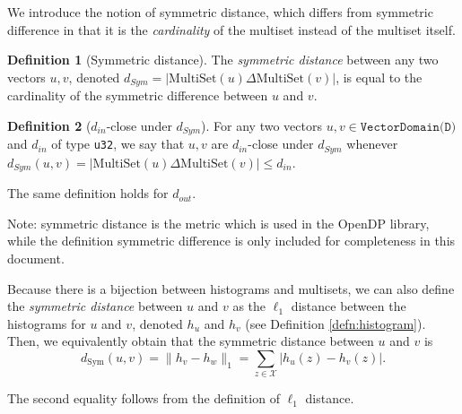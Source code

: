 \documentclass[11pt,a4paper]{article}
\theoremstyle{definition}
\newtheorem{definition}{Definition}[section]
\newcommand{\MultiSet}{\mathrm{MultiSet}}
\newcommand{\din}{d_{in}}
\newcommand{\dout}{d_{out}}
\newcommand{\silvia}[1]{{ {\color{blue}{(silvia)~#1}}}}
\newcommand{\grace}[1]{{ {\color{purple}{(grace)~#1}}}}
\newcommand{\connor}[1]{{ {\color{teal}{(connor)~#1}}}}
\begin{document}


We introduce the notion of symmetric distance, which differs from symmetric difference in that it is the \emph{cardinality} of the multiset instead of the multiset itself.

\begin{definition}[Symmetric distance]
The \textit{symmetric distance} between any two vectors $u, v$, denoted $d_{Sym} = |\MultiSet(u) \Delta \MultiSet(v)|$, is equal to the cardinality of the symmetric difference between $u$ and $v$.
\end{definition}


\begin{definition}[$\din$-close under $d_{Sym}$]
    For any two vectors $u, v \in \texttt{VectorDomain(D)}$ and $\din$ of type \texttt{u32}, we say that $u, v$ are $\din$-close under $d_{Sym}$ whenever $d_{Sym}(u, v) = |\MultiSet(u) \Delta \MultiSet(v)| \leq \din$. \silvia{Should this also be moved to the pseudocode defs document now that the list of domains and associated type is there?}
\end{definition}

The same definition holds for $\dout$.

Note: symmetric distance is the metric which is used in the OpenDP library, while the definition symmetric difference is only included for completeness in this document.

Because there is a bijection between histograms and multisets, we can also define the \emph{symmetric distance} between $u$ and $v$ as the $\ell_1$ distance between the histograms for $u$ and $v$, denoted $h_u$ and $h_v$ (see Definition \ref{defn:histogram}). Then, we equivalently obtain that the symmetric distance between $u$ and $v$ is
$$d_{\text{Sym}}(u,v) = \lVert h_{v} - h_{w}\rVert_1 = \sum_{z\in \mathcal{X}} |h_u(z) - h_{v}(z)|.$$

The second equality follows from the definition of $\ell_1$ distance.

\silvia{Add the above as claim?}

\connor{Since these definitions are all written by us, I think we could say that we're defining symmetric distance as both things.}
\end{document}
